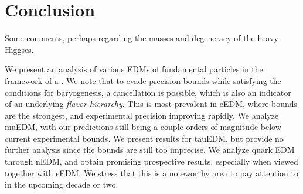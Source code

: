 \chapter{Conclusion}
\label{ch:conclusion}

Some comments, perhaps regarding the masses and degeneracy of the heavy Higgses.

We present an analysis of various EDMs of fundamental particles in the framework of a {\gthdm}.
We note that to evade precision bounds while satisfying the conditions for baryogenesis, a cancellation is possible,
which is also an indicator of an underlying \textit{flavor hierarchy}.
This is most prevalent in eEDM, where bounds are the strongest, and experimental precision improving rapidly.
We analyze muEDM, with our predictions still being a couple orders of magnitude below current experimental bounds.
We present results for tauEDM, but provide no further analysis since the bounds are still too imprecise.
We analyze quark EDM through nEDM, and optain promising prospective results, especially when viewed together with eEDM.
We stress that this is a noteworthy area to pay attention to in the upcoming decade or two.